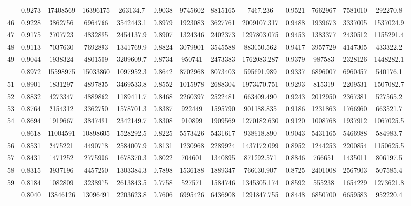 \documentclass[
  12pt,
]{article}
\begin{document}
\begin{longtable}[t]{lcccccccccccc}
\addlinespace
45 & 0.9273 & 17408569 & 16396175 & 263134.7 & 0.9038 & 9745602 & 8815165 & 7467.236 & 0.9521 & 7662967 & 7581010 & 292270.8\\
46 & 0.9228 & 3862756 & 6964766 & 3542443.1 & 0.8979 & 1923083 & 3627761 & 2009107.317 & 0.9488 & 1939673 & 3337005 & 1537024.9\\
47 & 0.9175 & 2707723 & 4832885 & 2454137.9 & 0.8907 & 1324346 & 2402373 & 1297803.075 & 0.9453 & 1383377 & 2430512 & 1155291.4\\
48 & 0.9113 & 7037630 & 7692893 & 1341769.9 & 0.8824 & 3079901 & 3545588 & 883050.562 & 0.9417 & 3957729 & 4147305 & 433322.2\\
49 & 0.9044 & 1938324 & 4801509 & 3209609.7 & 0.8734 & 950741 & 2473383 & 1762083.287 & 0.9379 & 987583 & 2328126 & 1448282.1\\
\addlinespace
50 & 0.8972 & 15598975 & 15033860 & 1097952.3 & 0.8642 & 8702968 & 8073403 & 595691.989 & 0.9337 & 6896007 & 6960457 & 540176.1\\
51 & 0.8901 & 1831297 & 4897835 & 3469533.8 & 0.8552 & 1015978 & 2688304 & 1973470.751 & 0.9293 & 815319 & 2209531 & 1507082.7\\
52 & 0.8832 & 4273347 & 4889862 & 1189411.7 & 0.8468 & 2260397 & 2522481 & 663409.490 & 0.9243 & 2012950 & 2367381 & 527565.2\\
53 & 0.8764 & 2154312 & 3362750 & 1578701.3 & 0.8387 & 922449 & 1595790 & 901188.835 & 0.9186 & 1231863 & 1766960 & 663521.7\\
54 & 0.8694 & 1919667 & 3847481 & 2342149.7 & 0.8308 & 910899 & 1909569 & 1270182.630 & 0.9120 & 1008768 & 1937912 & 1067025.5\\
\addlinespace
55 & 0.8618 & 11004591 & 10898605 & 1528292.5 & 0.8225 & 5573426 & 5431617 & 938918.890 & 0.9043 & 5431165 & 5466988 & 584983.7\\
56 & 0.8531 & 2475221 & 4490778 & 2584007.9 & 0.8131 & 1230968 & 2289924 & 1437172.099 & 0.8952 & 1244253 & 2200854 & 1150625.5\\
57 & 0.8431 & 1471252 & 2775906 & 1678370.3 & 0.8022 & 704601 & 1340895 & 871292.571 & 0.8846 & 766651 & 1435011 & 806197.5\\
58 & 0.8315 & 3937196 & 4457250 & 1303384.3 & 0.7898 & 1536188 & 1889347 & 766030.907 & 0.8725 & 2401008 & 2567903 & 507585.4\\
59 & 0.8184 & 1082809 & 3238975 & 2613843.5 & 0.7758 & 527571 & 1584746 & 1345305.174 & 0.8592 & 555238 & 1654229 & 1273621.8\\
\addlinespace
60 & 0.8040 & 13846126 & 13096491 & 2203623.8 & 0.7606 & 6995426 & 6436908 & 1291847.755 & 0.8448 & 6850700 & 6659583 & 952220.4\\

\end{longtable}
\end{document}
